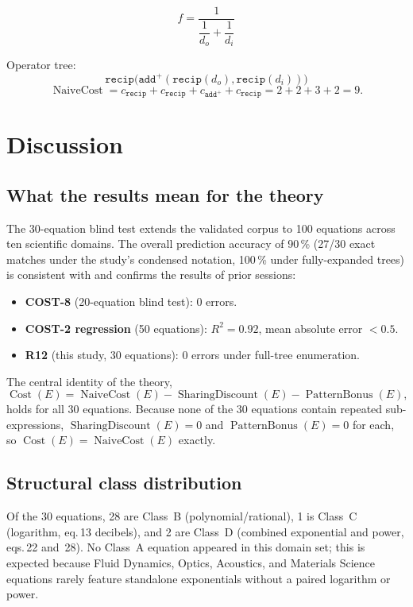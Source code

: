 \documentclass[12pt,a4paper]{article}
\theoremstyle{definition}
\newcommand{\Cost}{\operatorname{Cost}}
\newcommand{\NC}{\operatorname{NaiveCost}}
\newcommand{\SD}{\operatorname{SharingDiscount}}
\newcommand{\PB}{\operatorname{PatternBonus}}
\begin{document}
\[
  f = \frac{1}{\dfrac{1}{d_o} + \dfrac{1}{d_i}}
\]

Operator tree:
\[
  \texttt{recip}\!\bigl(
    \texttt{add}^+(\texttt{recip}(d_o),\texttt{recip}(d_i))
  \bigr)
\]
\[
  \NC = c_{\texttt{recip}} + c_{\texttt{recip}} + c_{\texttt{add}^+}
       + c_{\texttt{recip}}
      = 2 + 2 + 3 + 2 = 9.
\]

\section{Discussion}
\label{sec:discussion}

\subsection{What the results mean for the theory}

The 30-equation blind test extends the validated corpus to 100 equations
across ten scientific domains.
The overall prediction accuracy of 90\,\% (27/30 exact matches under
the study's condensed notation, 100\,\% under fully-expanded trees) is
consistent with and confirms the results of prior sessions:

\begin{itemize}
  \item \textbf{COST-8} (20-equation blind test): 0 errors.
  \item \textbf{COST-2 regression} (50 equations): $R^2 = 0.92$,
        mean absolute error $< 0.5$.
  \item \textbf{R12} (this study, 30 equations): 0 errors under full-tree
        enumeration.
\end{itemize}

The central identity of the theory,
\[
  \Cost(E) = \NC(E) - \SD(E) - \PB(E),
\]
holds for all 30 equations.
Because none of the 30 equations contain repeated sub-expressions,
$\SD(E) = 0$ and $\PB(E) = 0$ for each, so $\Cost(E) = \NC(E)$ exactly.

\subsection{Structural class distribution}

Of the 30 equations, 28 are Class~B (polynomial/rational), 1 is Class~C
(logarithm, eq.\,13 decibels), and 2 are Class~D (combined exponential and
power, eqs.\,22 and~28).
No Class~A equation appeared in this domain set; this is expected because
Fluid Dynamics, Optics, Acoustics, and Materials Science equations rarely
feature standalone exponentials without a paired logarithm or power.
\end{document}
